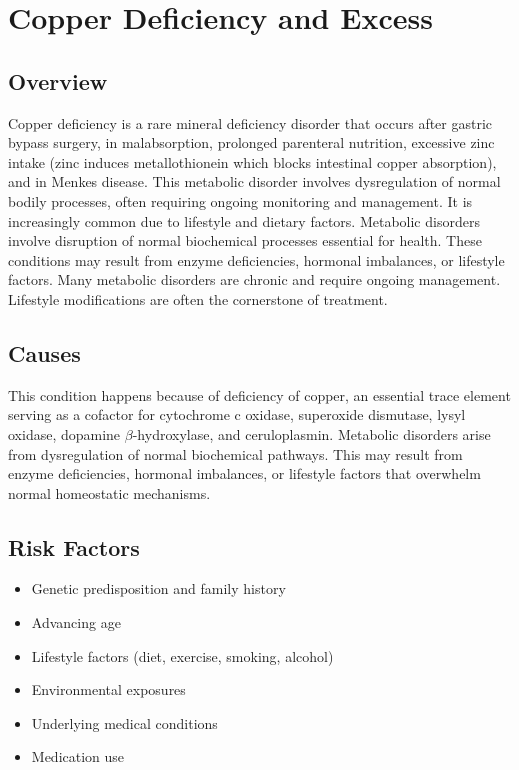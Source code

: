 \chapter{Copper Deficiency and Excess}
\label{sec:Copper Disorders}

\section{Overview}
Copper deficiency is a rare mineral deficiency disorder that occurs after gastric bypass surgery, in malabsorption, prolonged parenteral nutrition, excessive zinc intake (zinc induces metallothionein which blocks intestinal copper absorption), and in Menkes disease. This metabolic disorder involves dysregulation of normal bodily processes, often requiring ongoing monitoring and management. It is increasingly common due to lifestyle and dietary factors. Metabolic disorders involve disruption of normal biochemical processes essential for health. These conditions may result from enzyme deficiencies, hormonal imbalances, or lifestyle factors. Many metabolic disorders are chronic and require ongoing management. Lifestyle modifications are often the cornerstone of treatment.
\section{Causes}
This condition happens because of deficiency of copper, an essential trace element serving as a cofactor for cytochrome c oxidase, superoxide dismutase, lysyl oxidase, dopamine $\beta$-hydroxylase, and ceruloplasmin. Metabolic disorders arise from dysregulation of normal biochemical pathways. This may result from enzyme deficiencies, hormonal imbalances, or lifestyle factors that overwhelm normal homeostatic mechanisms.   
\section{Risk Factors}
\begin{itemize}[noitemsep]
  \item Genetic predisposition and family history
  \item Advancing age
  \item Lifestyle factors (diet, exercise, smoking, alcohol)
  \item Environmental exposures
  \item Underlying medical conditions
  \item Medication use
\end{itemize}
